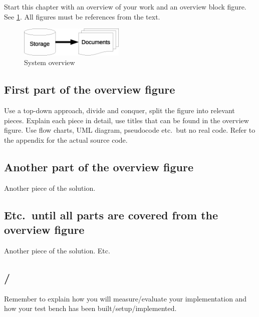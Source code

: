\section{}\label{sec:implementation}
Start this chapter with an overview of your work and an overview block figure. See
\cref{fig:overview}. All figures must be references from the text.

\begin{figure}
  \includegraphics[width=5cm]{Figures/Latex_figure1.eps}
  \caption{System overview}\label{fig:overview}
\end{figure}

\subsection{First part of the overview figure}\label{subsec:overview1}
Use a top-down approach, divide and conquer, split the figure into relevant pieces. Explain each
piece in detail, use titles that can be found in the overview figure. Use flow charts, UML diagram,
pseudocode etc.\ but no real code. Refer to the appendix for the actual source code.

\subsection{Another part of the overview figure}\label{subsec:overview2}
Another piece of the solution.

\subsection{Etc.\ until all parts are covered from the overview figure}
Another piece of the solution. Etc.\

\subsection{/
            }\label{subsec:eval_setup} 

Remember to explain how you will measure/evaluate your implementation and how your test bench has
been built/setup/implemented.
